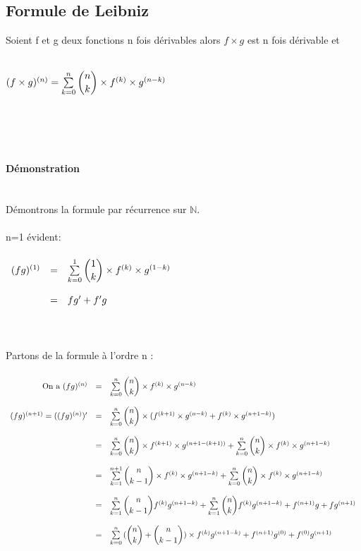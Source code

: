 \documentclass[a4paper,10pt]{book}
\newcommand{\N}{\mathbb{N}}
\begin{document}
\subsection{Formule de Leibniz}
Soient f et g deux fonctions n fois dérivables alors $f\times g$ est n fois dérivable et \\\\ \begin{Large}
$(f\times g)^{(n)} = \sum \limits_{k=0}^{n} \dbinom{n}{k}\times f^{(k)}\times g^{(n-k)}$\end{Large} \\\\\\\\
\textbf{Démonstration}\\\\\\
Démontrons la formule par récurrence sur $\N$.\\ \\
n=1 évident:\\ \\
$\begin{array}{rcl}
(fg)^{(1)}&=&\sum \limits_{k=0}^{1} \dbinom{1}{k} \times f^{(k)}\times g^{(1-k)} \\\\
&=& fg'+f'g
\end{array}$
\\ \\ \\ \\
Partons de la formule à l'ordre n : \\ \\
$\begin{array}{rcl}
\text{On a } (fg)^{(n)}&=&\sum \limits_{k=0}^{n} \dbinom{n}{k}\times f^{(k)}\times g^{(n-k)}\\\\
(fg)^{(n+1)}=((fg)^{(n)})' &=&\sum \limits_{k=0}^{n} \dbinom{n}{k} \times (f^{(k+1)}\times g^{(n-k)}+f^{(k)}\times g^{(n+1-k)})\\\\
&=&\sum \limits_{k=0}^{n} \dbinom{n}{k} \times f^{(k+1)}\times g^{(n+1-(k+1))}+\sum \limits_{k=0}^{n} \dbinom{n}{k} \times f^{(k)}\times g^{(n+1-k)}\\\\
&=&\sum \limits_{k=1}^{n+1} \dbinom{n}{k-1} \times f^{(k)}\times g^{(n+1-k)}+\sum \limits_{k=0}^{n} \dbinom{n}{k} \times f^{(k)}\times g^{(n+1-k)}\\\\
&=&\sum \limits_{k=1}^{n} \dbinom{n}{k-1}f^{(k)}g^{(n+1-k)}+\sum \limits_{k=1}^{n} \dbinom{n}{k}f^{(k)}g^{(n+1-k)}+f^{(n+1)}g+fg^{(n+1)}\\\\
&=&\sum \limits_{k=0}^{n}{}(\dbinom{n}{k}+\dbinom{n}{k-1})\times f^{(k)}g^{(n+1-k)}+f^{(n+1)}g^{(0)}+f^{(0)}g^{(n+1)}\\\\
\end{array}$ \\ \\
\end{document}
